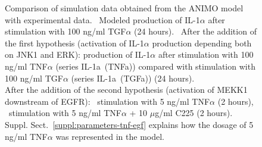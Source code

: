 \begin{figure}[!tpb]
\begin{center}
\end{center}
\caption{\scriptsize
Comparison of simulation data obtained from the ANIMO model with experimental data.
{\bf \protect{}}~Modeled production of IL-1$\alpha$ after stimulation with 100 ng/ml TGF$\alpha$ (24 hours).
{\bf \protect{}}~After the addition of the first hypothesis (activation of IL-1$\alpha$ production depending both
on JNK1 and ERK): production of IL-1$\alpha$ after stimulation with 100 ng/ml TNF$\alpha$ (series {\sf IL-1a~(TNFa)})
compared with stimulation with 100 ng/ml TGF$\alpha$ (series {\sf IL-1a~(TGFa)}) (24 hours).\\
After the addition of the second hypothesis (activation of MEKK1 downstream of EGFR): {\bf \protect{}}~stimulation with 5 ng/ml TNF$\alpha$ (2 hours),
{\bf \protect{}}~stimulation with 5 ng/ml TNF$\alpha$ + 10 $\mu$g/ml C225 (2 hours).
Suppl. Sect.~\ref{suppl:parameters-tnf-egf} explains how the dosage of 5 ng/ml TNF$\alpha$ was represented in the model.}\label{fig:large-model-graph}
\end{figure}


